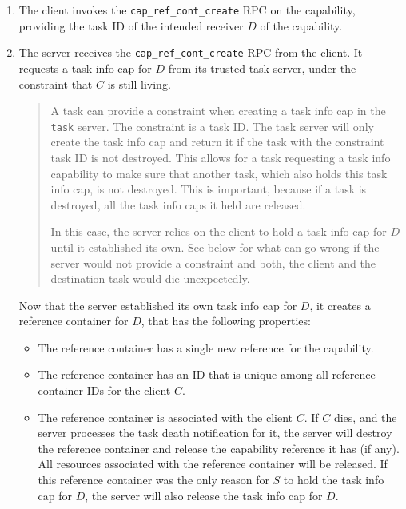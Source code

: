 \documentclass[9pt,a4paper]{extarticle}
\newenvironment{comment}{\footnotesize \begin{quote}}{\end{quote}}
\begin{document}
\begin{enumerate}
\item The client invokes the \verb/cap_ref_cont_create/ RPC on the
  capability, providing the task ID of the intended receiver $D$ of
  the capability.
  
\item The server receives the \verb/cap_ref_cont_create/ RPC from the
  client.  It requests a task info cap for $D$ from its trusted task
  server, under the constraint that $C$ is still living.

  \begin{comment}
    A task can provide a constraint when creating a task info cap in
    the \texttt{task} server.  The constraint is a task ID.  The task
    server will only create the task info cap and return it if the
    task with the constraint task ID is not destroyed.  This allows
    for a task requesting a task info capability to make sure that
    another task, which also holds this task info cap, is not
    destroyed.  This is important, because if a task is destroyed, all
    the task info caps it held are released.

    In this case, the server relies on the client to hold a task info
    cap for $D$ until it established its own.  See below for what can
    go wrong if the server would not provide a constraint and both,
    the client and the destination task would die unexpectedly.
  \end{comment}
  
  Now that the server established its own task info cap for $D$, it
  creates a reference container for $D$, that has the following
  properties:

  \begin{itemize}
  \item The reference container has a single new reference for the
    capability.
    
  \item The reference container has an ID that is unique among all
    reference container IDs for the client $C$.
    
  \item The reference container is associated with the client $C$.  If
    $C$ dies, and the server processes the task death notification for
    it, the server will destroy the reference container and release
    the capability reference it has (if any).  All resources
    associated with the reference container will be released.  If this
    reference container was the only reason for $S$ to hold the task
    info cap for $D$, the server will also release the task info cap
    for $D$.
    

\end{itemize}
\end{enumerate}
\end{document}
